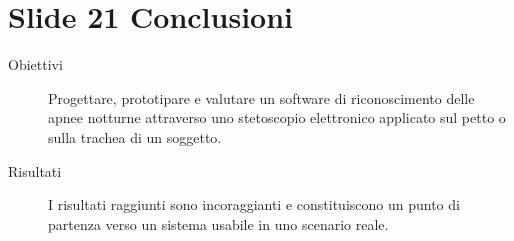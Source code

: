 \section{Slide 21 Conclusioni}

\begin{description}
  \item[Obiettivi]
    Progettare, prototipare e valutare un software di riconoscimento delle apnee notturne attraverso uno stetoscopio elettronico applicato sul petto o sulla trachea di un soggetto.
  \item[Risultati] 
    I risultati raggiunti sono incoraggianti e constituiscono un punto di partenza verso un sistema usabile in uno scenario reale.    
\end{description}